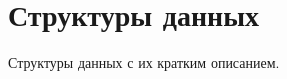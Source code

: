 \section{Структуры данных}
Структуры данных с их кратким описанием.\begin{DoxyCompactList}
\item{}
\item{}
\end{DoxyCompactList}

